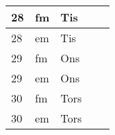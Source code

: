 \documentclass[a4paper]{article}
\begin{document}
\begin{table}[ht!]
\begin{tabular}{lllp{7cm}p{7cm}}
\multicolumn{1}{|l|}{28} & \multicolumn{1}{l|}{fm} & \multicolumn{1}{l|}{Tis} & \multicolumn{1}{l|}{} & \multicolumn{1}{l|}{} \\ \hline
\multicolumn{1}{|l|}{28} & \multicolumn{1}{l|}{em} & \multicolumn{1}{l|}{Tis} & \multicolumn{1}{l|}{} & \multicolumn{1}{l|}{} \\ \hline    

\multicolumn{1}{|l|}{29} & \multicolumn{1}{l|}{fm} & \multicolumn{1}{l|}{Ons} & \multicolumn{1}{l|}{} & \multicolumn{1}{l|}{} \\ \hline
\multicolumn{1}{|l|}{29} & \multicolumn{1}{l|}{em} & \multicolumn{1}{l|}{Ons} & \multicolumn{1}{l|}{} & \multicolumn{1}{l|}{} \\ \hline    

\multicolumn{1}{|l|}{30} & \multicolumn{1}{l|}{fm} & \multicolumn{1}{l|}{Tors} & \multicolumn{1}{l|}{} & \multicolumn{1}{l|}{} \\ \hline
\multicolumn{1}{|l|}{30} & \multicolumn{1}{l|}{em} & \multicolumn{1}{l|}{Tors} & \multicolumn{1}{l|}{} & \multicolumn{1}{l|}{} \\ \hline    

    \end{tabular}
    \end{table}
    
\end{document}
